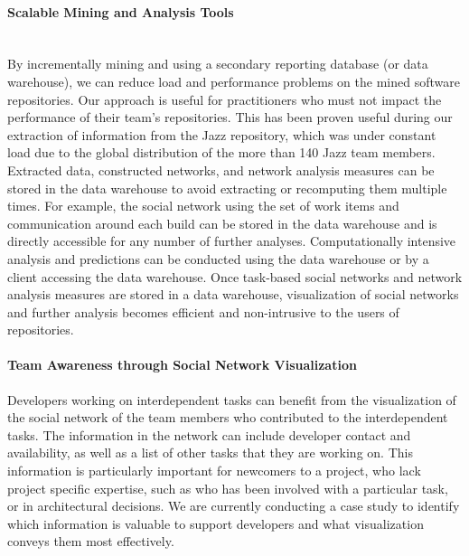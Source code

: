 \documentclass[12pt,oneside]{book}
\begin{document}
\paragraph{Scalable Mining and Analysis Tools}
\ \\
By incrementally mining and using a secondary reporting database (or data
warehouse), we can reduce load and performance problems on the mined software
repositories. Our approach is useful for practitioners who must not impact the
performance of their team's repositories.
This has been proven useful during our extraction of information from the Jazz
repository, which was under constant load due to the global distribution of the
more than 140 Jazz team members.
%
Extracted data, constructed networks, and network analysis measures can be stored
in the data warehouse to avoid extracting or recomputing them multiple times. For
example, the social network using the set of work items and communication around
each build can be stored in the data warehouse and is directly accessible for any
number of further analyses. Computationally intensive analysis and predictions
can be conducted using the data warehouse or by a client accessing the data
warehouse. Once task-based social networks and network analysis measures are
stored in a data warehouse, visualization of social networks and further analysis
becomes efficient and non-intrusive to the users of repositories.


\paragraph{Team Awareness through Social Network Visualization}
Developers working on interdependent tasks can benefit from the visualization of
the social network of the team members who contributed to the interdependent
tasks. The information in the network can include developer contact and
availability, as well as a list of other tasks that they are working on. This
information is particularly important for newcomers to a project, who lack
project specific expertise, such as who has been involved with a particular task,
or in architectural decisions.
We are currently conducting a case study to identify which information is
valuable to support developers and what visualization conveys them most
effectively.
 
\end{document}
